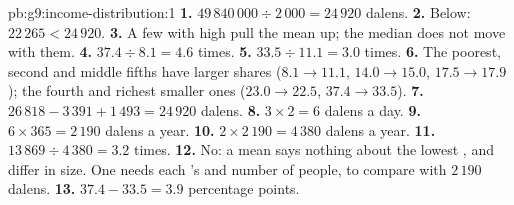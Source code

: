 \begin{solution}{pb:g9:income-distribution:1}
\textbf{1.} $49\,840\,000 \div 2\,000 = 24\,920$ dalens.
\textbf{2.} Below: $22\,265 < 24\,920$.
\textbf{3.} A few  with high  pull the mean up; the median does not move with them.
\textbf{4.} $37.4 \div 8.1 = 4.6$ times.
\textbf{5.} $33.5 \div 11.1 = 3.0$ times.
\textbf{6.} The poorest, second and middle fifths have larger shares ($8.1 \to 11.1$, $14.0 \to 15.0$, $17.5
\to 17.9$); the fourth and richest smaller ones ($23.0 \to 22.5$, $37.4 \to 33.5$).
\textbf{7.} $26\,818 - 3\,391 + 1\,493 = 24\,920$ dalens.
\textbf{8.} $3 \times 2 = 6$ dalens a day.
\textbf{9.} $6 \times 365 = 2\,190$ dalens a year.
\textbf{10.} $2 \times 2\,190 = 4\,380$ dalens a year.
\textbf{11.} $13\,869 \div 4\,380 = 3.2$ times.
\textbf{12.} No: a mean says nothing about the lowest , and  differ in size. One needs each
's  and number of people, to compare  with $2\,190$ dalens.
\textbf{13.} $37.4 - 33.5 = 3.9$ percentage points.
\end{solution}
